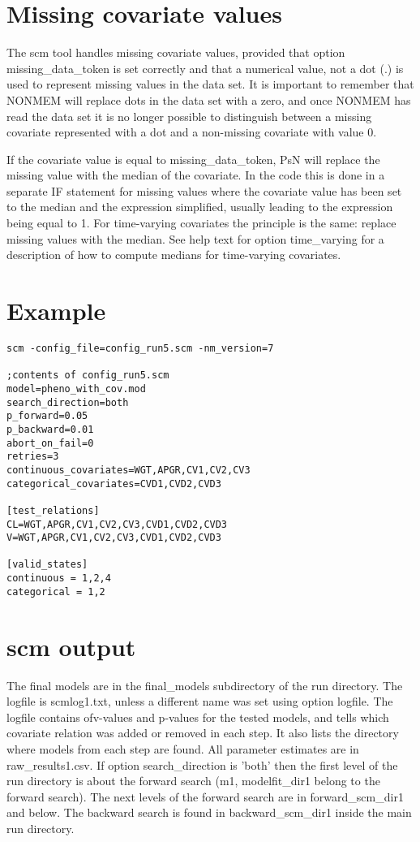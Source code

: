 \section{Missing covariate values}
The scm tool handles missing covariate values, provided that option missing\_data\_token is set correctly and that a numerical value, not a dot (.) is used to represent missing values in the data set. It is important to remember that NONMEM will replace dots in the data set with a zero, and once NONMEM has read the data set it is no longer possible to distinguish between a missing covariate represented with a dot and a non-missing covariate with value 0. 

If the covariate value is equal to missing\_data\_token, PsN will replace the missing value with the median of the covariate. In the code this is done in a separate IF statement for missing values where the covariate value has been set to the median and the expression simplified, usually leading to the expression being equal to 1. For time-varying covariates the principle is the same: replace missing values with the median. See help text for option time\_varying for a description of how to compute medians for time-varying covariates.  
\newpage

\section{Example}
\begin{verbatim}
scm -config_file=config_run5.scm -nm_version=7

;contents of config_run5.scm
model=pheno_with_cov.mod
search_direction=both
p_forward=0.05
p_backward=0.01
abort_on_fail=0
retries=3
continuous_covariates=WGT,APGR,CV1,CV2,CV3
categorical_covariates=CVD1,CVD2,CVD3

[test_relations]
CL=WGT,APGR,CV1,CV2,CV3,CVD1,CVD2,CVD3
V=WGT,APGR,CV1,CV2,CV3,CVD1,CVD2,CVD3

[valid_states]
continuous = 1,2,4
categorical = 1,2
\end{verbatim}

\section{scm output}
The final models are in the final\_models subdirectory of the run directory. The logfile is scmlog1.txt, unless a different name was set using option logfile. The logfile contains ofv-values and p-values for the tested models, and tells which covariate relation was added or removed in each step. It also lists the directory where models from each step are found. All parameter estimates are in raw\_results1.csv. If option search\_direction is 'both' then the first level of the run directory is about the forward search (m1, modelfit\_dir1 belong to the forward search). The next levels of the forward search are in forward\_scm\_dir1 and below. The backward search is found in backward\_scm\_dir1 inside the main run directory.  


